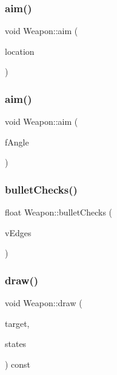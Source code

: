 \subsubsection{\texorpdfstring{aim()}{aim()}\hspace{0.1cm}{\footnotesize\ttfamily [1/2]}}
{\footnotesize\ttfamily void Weapon\+::aim (\begin{DoxyParamCaption}\item[{sf\+::\+Vector2f}]{location }\end{DoxyParamCaption})}

\mbox{\label{class_weapon_ab6c0fa278f3270cd16a7af4bc89492f5}} 
\subsubsection{\texorpdfstring{aim()}{aim()}\hspace{0.1cm}{\footnotesize\ttfamily [2/2]}}
{\footnotesize\ttfamily void Weapon\+::aim (\begin{DoxyParamCaption}\item[{float}]{f\+Angle }\end{DoxyParamCaption})}

\mbox{\label{class_weapon_a79520378af1fb9c1321b30b8ea3783a3}} 
\subsubsection{\texorpdfstring{bullet\+Checks()}{bulletChecks()}}
{\footnotesize\ttfamily float Weapon\+::bullet\+Checks (\begin{DoxyParamCaption}\item[{std\+::vector$<$ sf\+::\+Vector2f $>$}]{v\+Edges }\end{DoxyParamCaption})}

\mbox{\label{class_weapon_a979a2ea89a3fb50503b7619d437861f3}} 
\subsubsection{\texorpdfstring{draw()}{draw()}}
{\footnotesize\ttfamily void Weapon\+::draw (\begin{DoxyParamCaption}\item[{sf\+::\+Render\+Target \&}]{target,  }\item[{sf\+::\+Render\+States}]{states }\end{DoxyParamCaption}) const\hspace{0.3cm}{\ttfamily [private]}}




